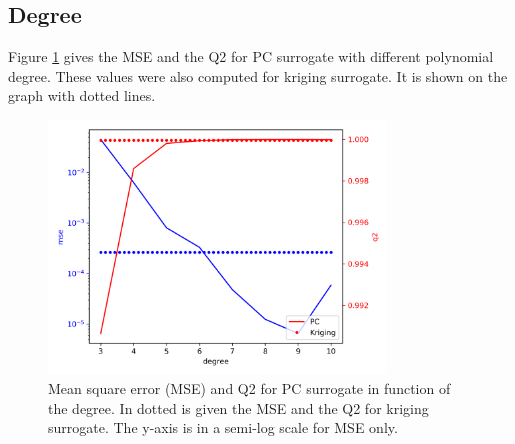 \documentclass[hidelinks,12pt]{article}
\begin{document}
\subsection{Degree}

Figure \ref{degree} gives the MSE and the Q2 for PC surrogate with different polynomial degree. These values were also computed for kriging surrogate. It is shown on the graph with dotted lines.

\begin{figure}
  \centering
  \includegraphics[width=0.8\textwidth]{images/degree.png}
  \caption{Mean square error (MSE) and Q2 for PC surrogate in function of the degree. In dotted is given the MSE and the Q2 for kriging surrogate. The y-axis is in a semi-log scale for MSE only.}
  	\label{degree}
\end{figure}
\end{document}
